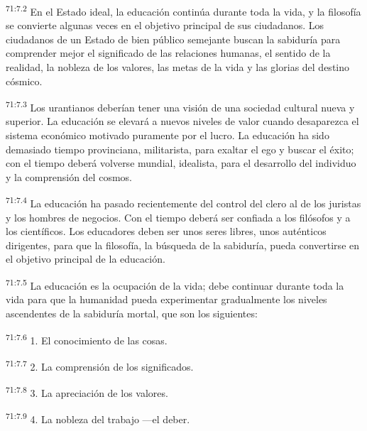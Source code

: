 \documentclass[twoside, 11pt]{book}
\begin{document}
\par
\textsuperscript{71:7.2} En el Estado ideal, la educación continúa durante toda la vida, y la filosofía se convierte algunas veces en el objetivo principal de sus ciudadanos. Los ciudadanos de un Estado de bien público semejante buscan la sabiduría para comprender mejor el significado de las relaciones humanas, el sentido de la realidad, la nobleza de los valores, las metas de la vida y las glorias del destino cósmico.

\par
\textsuperscript{71:7.3} Los urantianos deberían tener una visión de una sociedad cultural nueva y superior. La educación se elevará a nuevos niveles de valor cuando desaparezca el sistema económico motivado puramente por el lucro. La educación ha sido demasiado tiempo provinciana, militarista, para exaltar el ego y buscar el éxito; con el tiempo deberá volverse mundial, idealista, para el desarrollo del individuo y la comprensión del cosmos.

\par
\textsuperscript{71:7.4} La educación ha pasado recientemente del control del clero al de los juristas y los hombres de negocios. Con el tiempo deberá ser confiada a los filósofos y a los científicos. Los educadores deben ser unos seres libres, unos auténticos dirigentes, para que la filosofía, la búsqueda de la sabiduría, pueda convertirse en el objetivo principal de la educación.

\par
\textsuperscript{71:7.5} La educación es la ocupación de la vida; debe continuar durante toda la vida para que la humanidad pueda experimentar gradualmente los niveles ascendentes de la sabiduría mortal, que son los siguientes:

\par
\textsuperscript{71:7.6} 1. El conocimiento de las cosas.

\par
\textsuperscript{71:7.7} 2. La comprensión de los significados.

\par
\textsuperscript{71:7.8} 3. La apreciación de los valores.

\par
\textsuperscript{71:7.9} 4. La nobleza del trabajo ---el deber.
\end{document}
